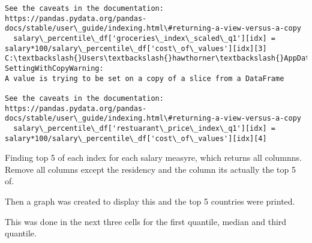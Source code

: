 \documentclass[11pt]{article}
\begin{document}
\begin{Verbatim}[commandchars=\\\{\}]
See the caveats in the documentation: https://pandas.pydata.org/pandas-
docs/stable/user\_guide/indexing.html\#returning-a-view-versus-a-copy
  salary\_percentile\_df['groceries\_index\_scaled\_q1'][idx] =
salary*100/salary\_percentile\_df['cost\_of\_values'][idx][3]
C:\textbackslash{}Users\textbackslash{}hawthorner\textbackslash{}AppData\textbackslash{}Local\textbackslash{}Temp\textbackslash{}ipykernel\_22188\textbackslash{}773068333.py:48:
SettingWithCopyWarning:
A value is trying to be set on a copy of a slice from a DataFrame

See the caveats in the documentation: https://pandas.pydata.org/pandas-
docs/stable/user\_guide/indexing.html\#returning-a-view-versus-a-copy
  salary\_percentile\_df['restuarant\_price\_index\_q1'][idx] =
salary*100/salary\_percentile\_df['cost\_of\_values'][idx][4]
    \end{Verbatim}

    Finding top 5 of each index for each salary measyre, which returns all
columnns. Remove all columns except the residency and the column its
actually the top 5 of.

Then a graph was created to display this and the top 5 countries were
printed.

This was done in the next three cells for the first quantile, median and
third quantile.
\end{document}
